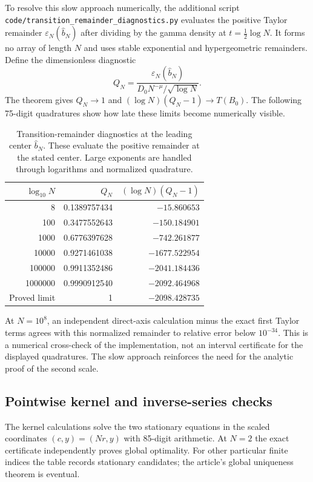 To resolve this slow approach numerically, the additional script
\nolinkurl{code/transition_remainder_diagnostics.py} evaluates the
positive Taylor remainder $\varepsilon_N(\widehat b_N)$ after dividing
by the gamma density at $t=\tfrac12\log N$. It forms no array of
length $N$ and uses stable exponential and hypergeometric remainders.
Define the dimensionless diagnostic
\[
 Q_N=\frac{\varepsilon_N(\widehat b_N)}
              {D_0N^{-\mu}/\sqrt{\log N}}.
\]
The theorem gives $Q_N\to1$ and
$(\log N)(Q_N-1)\to T(B_0)$. The following 75-digit quadratures
show how late these limits become numerically visible.

\begin{table}[htbp]
\centering
\begin{tabular}{rrr}
\toprule
$\log_{10}N$ & $Q_N$ & $(\log N)(Q_N-1)$\\
\midrule
8 & 0.1389757434 & $-15.860653$\\
100 & 0.3477552643 & $-150.184901$\\
1000 & 0.6776397628 & $-742.261877$\\
10000 & 0.9271461038 & $-1677.522954$\\
100000 & 0.9911352486 & $-2041.184436$\\
1000000 & 0.9990912540 & $-2092.464968$\\
\midrule
Proved limit & 1 & $-2098.428735$\\
\bottomrule
\end{tabular}
\caption{Transition-remainder diagnostics at the leading center
$\widehat b_N$. These evaluate the positive remainder at the stated
center. Large exponents are handled through
logarithms and normalized quadrature.}
\label{tab:transition-diagnostics}
\end{table}

At $N=10^8$, an independent direct-axis calculation minus the exact
first Taylor terms agrees with this normalized remainder to relative
error below $10^{-34}$. This is a numerical cross-check of the
implementation, not an interval certificate for the displayed
quadratures. The slow approach reinforces the need for the analytic
proof of the second scale.

\subsection{Pointwise kernel and inverse-series checks}

The kernel calculations solve the two stationary equations in the
scaled coordinates $(c,y)=(Nr,y)$ with 85-digit arithmetic.
At $N=2$ the exact certificate independently proves global optimality.
For other particular finite indices the table records stationary
candidates; the article's global uniqueness theorem is eventual.

